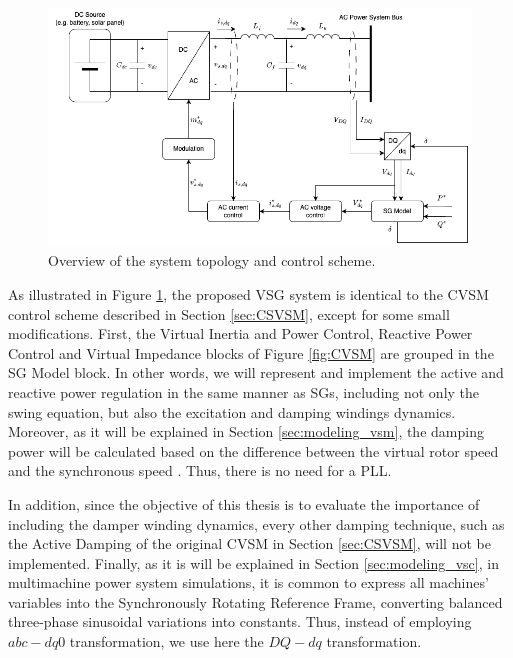 \begin{figure}[ht!]
    \centering
    \includegraphics[width=12cm]{images/generic_gfmi.png}
    \caption{Overview of the system topology and control scheme.}
    \label{fig:generic_gfmi}
\end{figure}

As illustrated in Figure \ref{fig:generic_gfmi}, the proposed VSG system is
identical to the CVSM control scheme described in Section \ref{sec:CSVSM},
except for some small modifications. First, the Virtual Inertia and Power
Control, Reactive Power Control and Virtual Impedance blocks of Figure
\ref{fig:CVSM} are grouped in the SG Model block. In other words, we will
represent and implement the active and reactive power regulation in the same 
manner as SGs, including not only the swing equation, but also the excitation
and damping windings dynamics. Moreover, as it will be explained in Section
\ref{sec:modeling_vsm}, the damping power will be calculated based on the
difference between the virtual rotor speed and the synchronous speed
\cite{krause2002analysis,kundur2022power,sauer2017power}. Thus, there is no need
for a PLL.

In addition, since the objective of this thesis is to evaluate the importance of
including the damper winding dynamics, every other damping technique, such as
the Active Damping of the original CVSM in Section \ref{sec:CSVSM}, will not be
implemented. Finally, as it is will be explained in Section
\ref{sec:modeling_vsc}, in multimachine power system simulations, it is common
to express all machines' variables into the Synchronously Rotating Reference
Frame, converting balanced three-phase sinusoidal variations into constants.
Thus, instead of employing $abc-dq0$ transformation, we use here the $DQ-dq$
transformation.

